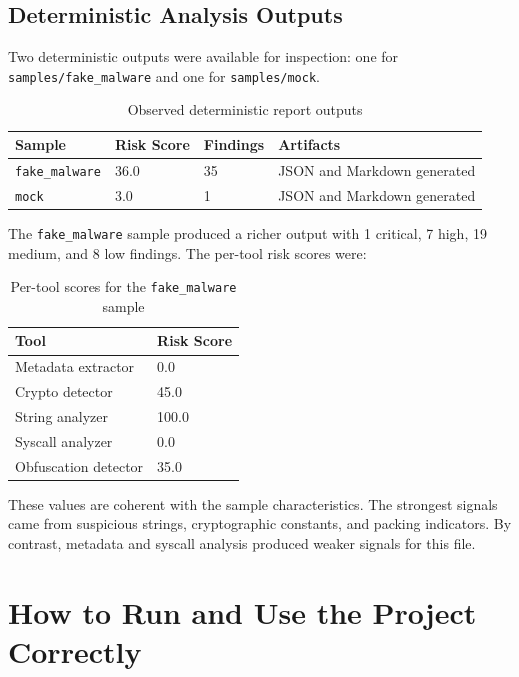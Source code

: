 \documentclass[11pt,a4paper]{article}
\begin{document}
\subsection{Deterministic Analysis Outputs}
Two deterministic outputs were available for inspection: one for \texttt{samples/fake\_malware} and one for \texttt{samples/mock}.

\begin{table}[H]
\centering
\renewcommand{\arraystretch}{1.3}
\begin{tabular}{p{4.2cm} p{2cm} p{2cm} p{3.3cm}}
\toprule
\textbf{\color{primary}Sample} & \textbf{\color{primary}Risk Score} & \textbf{\color{primary}Findings} & \textbf{\color{primary}Artifacts} \\
\midrule
\texttt{fake\_malware} & 36.0 & 35 & JSON and Markdown generated \\
\texttt{mock} & 3.0 & 1 & JSON and Markdown generated \\
\bottomrule
\end{tabular}
\caption{Observed deterministic report outputs}
\end{table}

The \texttt{fake\_malware} sample produced a richer output with 1 critical, 7 high, 19 medium, and 8 low findings. The per-tool risk scores were:

\begin{table}[H]
\centering
\renewcommand{\arraystretch}{1.3}
\begin{tabular}{p{5.4cm} p{2.4cm}}
\toprule
\textbf{\color{primary}Tool} & \textbf{\color{primary}Risk Score} \\
\midrule
Metadata extractor & 0.0 \\
Crypto detector & 45.0 \\
String analyzer & 100.0 \\
Syscall analyzer & 0.0 \\
Obfuscation detector & 35.0 \\
\bottomrule
\end{tabular}
\caption{Per-tool scores for the \texttt{fake\_malware} sample}
\end{table}

These values are coherent with the sample characteristics. The strongest signals came from suspicious strings, cryptographic constants, and packing indicators. By contrast, metadata and syscall analysis produced weaker signals for this file.

\section{How to Run and Use the Project Correctly}
\end{document}
